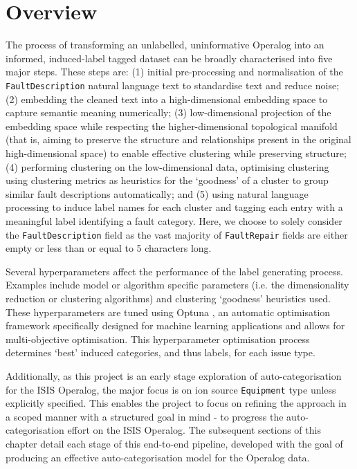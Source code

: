 \documentclass[10pt,oneside]{report}
\begin{document}
\section{Overview}


The process of transforming an unlabelled, uninformative Operalog into an informed, induced-label tagged dataset can be broadly characterised into five major steps. These steps are: (1) initial pre-processing and normalisation of the \texttt{FaultDescription} natural language text to standardise text and reduce noise; (2) embedding the cleaned text into a high-dimensional embedding space to capture semantic meaning numerically; (3) low-dimensional projection of the embedding space while respecting the higher-dimensional topological manifold (that is, aiming to preserve the structure and relationships present in the original high-dimensional space) to enable effective clustering while preserving structure; (4) performing clustering on the low-dimensional data, optimising clustering using clustering metrics as heuristics for the `goodness' of a cluster to group similar fault descriptions automatically; and (5) using natural language processing to induce label names for each cluster and tagging each entry with a meaningful label identifying a fault category.  Here, we choose to solely consider the \texttt{FaultDescription} field as the vast majority of \texttt{FaultRepair} fields are either empty or less than or equal to 5 characters long. 

Several hyperparameters affect the performance of the label generating process. Examples include model or algorithm specific parameters (i.e. the dimensionality reduction or clustering algorithms) and clustering `goodness' heuristics used. These hyperparameters are tuned using Optuna \cite{akiba2019optuna}, an automatic optimisation framework specifically designed for machine learning applications and allows for multi-objective optimisation. This hyperparameter optimisation process determines `best' induced categories, and thus labels, for each issue type. 

Additionally, as this project is an early stage exploration of auto-categorisation for the ISIS Operalog, the major focus is on ion source \texttt{Equipment} type unless explicitly specified. This enables the project to focus on refining the approach in a scoped manner with a structured goal in mind - to progress the auto-categorisation effort on the ISIS Operalog. The subsequent sections of this chapter detail each stage of this end-to-end pipeline, developed with the goal of producing an effective auto-categorisation model for the Operalog data.
\end{document}
